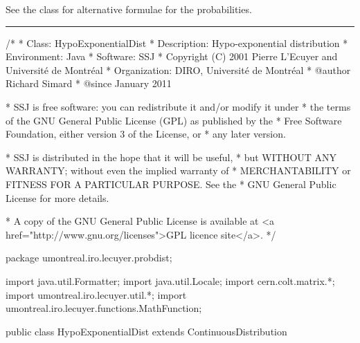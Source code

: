 See the class  for alternative formulae
for the probabilities.



\bigskip\hrule

\begin{code}\begin{hide}
/*
 * Class:        HypoExponentialDist
 * Description:  Hypo-exponential distribution
 * Environment:  Java
 * Software:     SSJ 
 * Copyright (C) 2001  Pierre L'Ecuyer and Université de Montréal
 * Organization: DIRO, Université de Montréal
 * @author       Richard Simard
 * @since        January 2011

 * SSJ is free software: you can redistribute it and/or modify it under
 * the terms of the GNU General Public License (GPL) as published by the
 * Free Software Foundation, either version 3 of the License, or
 * any later version.

 * SSJ is distributed in the hope that it will be useful,
 * but WITHOUT ANY WARRANTY; without even the implied warranty of
 * MERCHANTABILITY or FITNESS FOR A PARTICULAR PURPOSE.  See the
 * GNU General Public License for more details.

 * A copy of the GNU General Public License is available at
   <a href="http://www.gnu.org/licenses">GPL licence site</a>.
 */
\end{hide}
package umontreal.iro.lecuyer.probdist;
\begin{hide}
import java.util.Formatter;
import java.util.Locale;
import cern.colt.matrix.*;
import  umontreal.iro.lecuyer.util.*;
import umontreal.iro.lecuyer.functions.MathFunction;
\end{hide}

public class HypoExponentialDist extends ContinuousDistribution\begin{hide} {
   protected double[] m_lambda;

   protected static void testLambda (double[] lambda) {
      int k = lambda.length;
      for (int j = 0; j < k; ++j) {
         if (lambda[j] <= 0)
            throw new IllegalArgumentException ("lambda_j <= 0");
      }
   }


   // Builds the bidiagonal matrix A out of the lambda
   private static DoubleMatrix2D buildMatrix (double[] lambda, double x) {
      int k = lambda.length;
      DoubleFactory2D F2 = DoubleFactory2D.dense;
      DoubleMatrix2D A = F2.make(k, k);
      for (int j = 0; j < k-1; j++) {
         A.setQuick(j, j, -lambda[j]*x);
         A.setQuick(j, j + 1, lambda[j]*x);
      }
      A.setQuick(k-1, k-1, -lambda[k-1]*x);
      return A;
   }


   private static class myFunc implements MathFunction {
      // For inverseF
      private double[] m_lam;
      private double m_u;

      public myFunc (double[] lam, double u) {
         m_lam = lam;
         m_u = u;
      }

      public double evaluate (double x) {
         return m_u - HypoExponentialDist.cdf(m_lam, x);
      }
   }
\end{hide}
\end{code}
